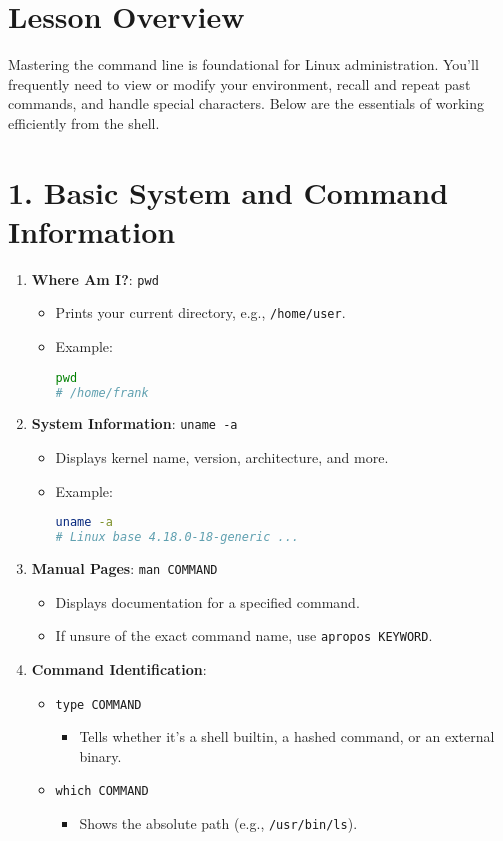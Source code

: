 \documentclass[a4paper]{report}
\begin{document}
\section*{Lesson Overview}
Mastering the command line is foundational for Linux administration. You’ll frequently need to view or modify your environment, recall and repeat past commands, and handle special characters. Below are the essentials of working efficiently from the shell.

\section*{1. Basic System and Command Information}
\begin{enumerate}
    \item \textbf{Where Am I?}: \texttt{pwd}
    \begin{itemize}
        \item Prints your current directory, e.g., \texttt{/home/user}.
        \item Example:
        \begin{lstlisting}[language=bash]
pwd
# /home/frank
        \end{lstlisting}
    \end{itemize}

    \item \textbf{System Information}: \texttt{uname -a}
    \begin{itemize}
        \item Displays kernel name, version, architecture, and more.
        \item Example:
        \begin{lstlisting}[language=bash]
uname -a
# Linux base 4.18.0-18-generic ...
        \end{lstlisting}
    \end{itemize}

    \item \textbf{Manual Pages}: \texttt{man COMMAND}
    \begin{itemize}
        \item Displays documentation for a specified command.
        \item If unsure of the exact command name, use \texttt{apropos KEYWORD}.
    \end{itemize}

    \item \textbf{Command Identification}:
    \begin{itemize}
        \item \texttt{type COMMAND}
        \begin{itemize}
            \item Tells whether it’s a shell builtin, a hashed command, or an external binary.
        \end{itemize}
        \item \texttt{which COMMAND}
        \begin{itemize}
            \item Shows the absolute path (e.g., \texttt{/usr/bin/ls}).
        \end{itemize}
    \end{itemize}
\end{enumerate}
\end{document}
